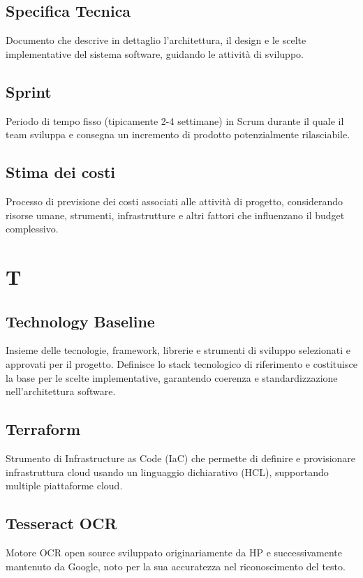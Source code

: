 \documentclass[a4paper,11pt]{article}
\begin{document}
\subsection{Specifica Tecnica}
Documento che descrive in dettaglio l'architettura, il design e le scelte implementative del sistema software, guidando le attività di sviluppo.

\subsection{Sprint}
Periodo di tempo fisso (tipicamente 2-4 settimane) in Scrum durante il quale il team sviluppa e consegna un incremento di prodotto potenzialmente rilasciabile.

\subsection{Stima dei costi}
Processo di previsione dei costi associati alle attività di progetto, considerando risorse umane, strumenti, infrastrutture e altri fattori che influenzano il budget complessivo.

\newpage
\section{T}

\subsection{Technology Baseline}
Insieme delle tecnologie, framework, librerie e strumenti di sviluppo selezionati e approvati per il progetto. Definisce lo stack tecnologico di riferimento e costituisce la base per le scelte implementative, garantendo coerenza e standardizzazione nell'architettura software.

\subsection{Terraform}
Strumento di Infrastructure as Code (IaC) che permette di definire e provisionare infrastruttura cloud usando un linguaggio dichiarativo (HCL), supportando multiple piattaforme cloud.

\subsection{Tesseract OCR}
Motore OCR open source sviluppato originariamente da HP e successivamente mantenuto da Google, noto per la sua accuratezza nel riconoscimento del testo.
\end{document}
